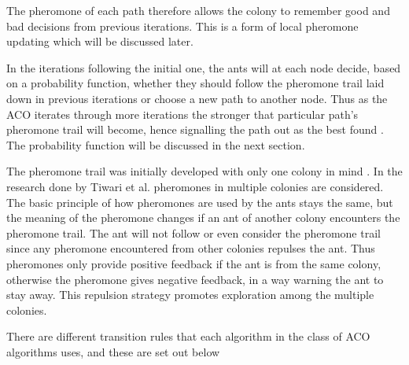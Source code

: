 The pheromone of each path therefore allows the colony to remember good and bad decisions from previous iterations\cite{CompuIntelligenceIntro}. This is a form of local pheromone updating \label{def:localpheromoneupdate}which will be discussed later. 

In the iterations following the initial one, the ants will at each node decide, based on a probability function, whether they should follow the pheromone trail laid down in previous iterations or choose a new path to another node\cite{AntQAP,AntsAndStigmergy,CompuIntelligenceIntro}. Thus as the ACO iterates through more iterations the stronger that particular path's pheromone trail will become, hence signalling the path out as the best found \cite{CompuIntelligenceIntro}. The probability function will be discussed in the next section.

The pheromone trail was initially developed with only one colony in mind \cite{CompuIntelligenceIntro}. In the research done by Tiwari et al.\cite{ACOLargeProblem} pheromones in multiple colonies are considered. The basic principle of how pheromones are used by the ants stays the same, but the meaning of the pheromone changes if an ant of another colony encounters the pheromone trail\cite{AntQAP,AntsAndStigmergy,CompuIntelligenceIntro}. The ant will not follow or even consider the pheromone trail since any pheromone encountered from other colonies repulses the ant\cite{ACOLargeProblem}. Thus pheromones only provide positive feedback if the ant is from the same colony, otherwise the pheromone gives negative feedback, in a way warning the ant to stay away\cite{ACOLargeProblem}. This repulsion strategy promotes exploration among the multiple colonies\cite{ACOLargeProblem}.

There are different transition rules that each algorithm in the class of ACO algorithms uses, and these are set out below
